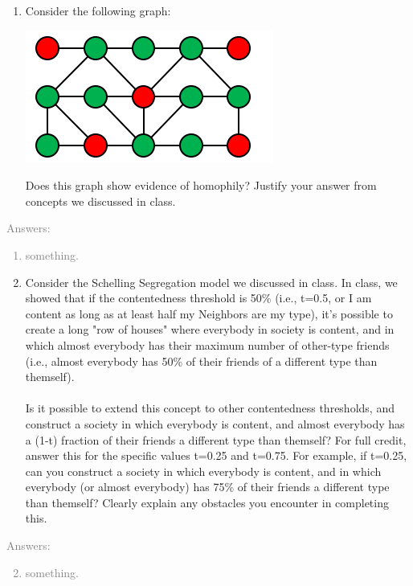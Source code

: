 \documentclass[11pt]{article}
\begin{document}
\begin{enumerate} 
	\item Consider the following graph:
	\begin{center}
		\includegraphics[scale=1]{canvas-1}\\
	\end{center}
 	Does this graph show evidence of homophily? Justify your answer from concepts we discussed in class.
\end{enumerate}
	\textcolor{gray}{
	Answers:
	\begin{enumerate} 
		\item something.
	\end {enumerate}}
\begin{enumerate} 
	\setcounter{enumi}{1} 
	\item Consider the Schelling Segregation model we discussed in class. In class, we showed that if the contentedness threshold is 50\% (i.e., t=0.5, or I am content as long as at least half my Neighbors are my type), it's possible to create a long "row of houses" where everybody in society is content, and in which almost everybody has their maximum number of other-type friends (i.e., almost everybody has 50\% of their friends of a different type than themself).\\\\

Is it possible to extend this concept to other contentedness thresholds, and construct a society in which everybody is content, and almost everybody has a (1-t) fraction of their friends a different type than themself? For full credit, answer this for the specific values t=0.25 and t=0.75. For example, if t=0.25, can you construct a society in which everybody is content, and in which everybody (or almost everybody) has 75\% of their friends a different type than themself? Clearly explain any obstacles you encounter in completing this.\\
\end {enumerate}
	\textcolor{gray}{
	Answers:
	\begin{enumerate} 
	\setcounter{enumi}{1} 
		\item something.
	\end {enumerate}}
\end{document}
